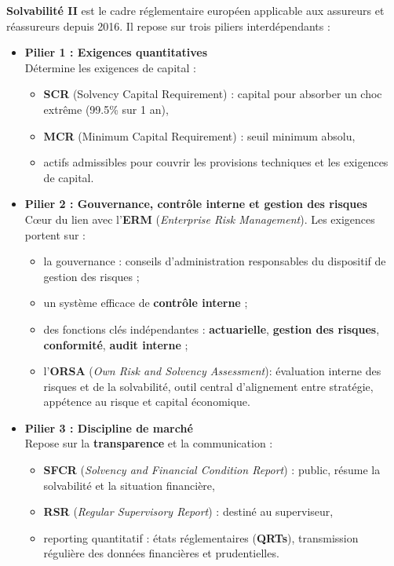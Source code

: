 	
\begin{f}
	
	\textbf{Solvabilité II} est le cadre réglementaire européen applicable aux assureurs et réassureurs depuis 2016. Il repose sur trois piliers interdépendants :
	
	\begin{itemize}
		\item \textbf{Pilier 1 : Exigences quantitatives} \\
		Détermine les exigences de capital :
		\begin{itemize}
			\item \textbf{SCR} (Solvency Capital Requirement) : capital pour absorber un choc extrême (99.5\% sur 1 an),
			\item \textbf{MCR} (Minimum Capital Requirement) : seuil minimum absolu,
			\item actifs admissibles pour couvrir les provisions techniques et les exigences de capital.
		\end{itemize}
		
		\item \textbf{Pilier 2 : Gouvernance, contrôle interne et gestion des risques} \\
		Cœur du lien avec l'\textbf{ERM} (\emph{Enterprise Risk Management}). Les exigences portent sur :
		\begin{itemize}
			\item la gouvernance : conseils d'administration responsables du dispositif de gestion des risques ;
			\item un système efficace de \textbf{contrôle interne} ;
			\item des fonctions clés indépendantes : \textbf{actuarielle}, \textbf{gestion des risques}, \textbf{conformité}, \textbf{audit interne} ;
			\item l'\textbf{ORSA} (\emph{Own Risk and Solvency Assessment}): évaluation interne des risques et de la solvabilité, outil central d'alignement entre stratégie, appétence au risque et capital économique.
		\end{itemize}
		
		\item \textbf{Pilier 3 : Discipline de marché} \\
		Repose sur la \textbf{transparence} et la communication :
		\begin{itemize}
			\item \textbf{SFCR} (\emph{Solvency and Financial Condition Report}) : public, résume la solvabilité et la situation financière,
			\item \textbf{RSR} (\emph{Regular Supervisory Report}) : destiné au superviseur,
			\item reporting quantitatif : états réglementaires (\textbf{QRTs}), transmission régulière des données financières et prudentielles.
		\end{itemize}
	\end{itemize}
		
\end{f}
